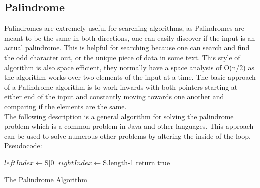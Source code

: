 \documentclass[10pt,twocolumn]{IEEEtran}
\begin{document}
\subsection{Palindrome}
Palindromes are extremely useful for searching algorithms, as Palindromes are meant to be the same in both directions, one can easily discover if the input is an actual palindrome. This is helpful for searching because one can search and find the odd character out, or the unique piece of data in some text. This style of algorithm is also space efficient, they normally have a space analysis of O(n/2) as the algorithm works over two elements of the input at a time. The basic approach of a Palindrome algorithm is to work inwards with both pointers starting at either end of the input and constantly moving towards one another and comparing if the elements are the same.\\  
The following description is a general algorithm for solving the palindrome problem which is a common problem in Java and other languages. This approach can be used to solve numerous other problems by altering the inside of the loop.
Pseudocode:
\IncMargin{1em}
\begin{algorithm}
	\SetAlgoLined
	$leftIndex  \longleftarrow $S[0]\;
	$rightIndex \longleftarrow $S.length-1\;
return true\;
\caption{The Palindrome Algorithm}
\end{algorithm}\DecMargin{1em}
\end{document}
